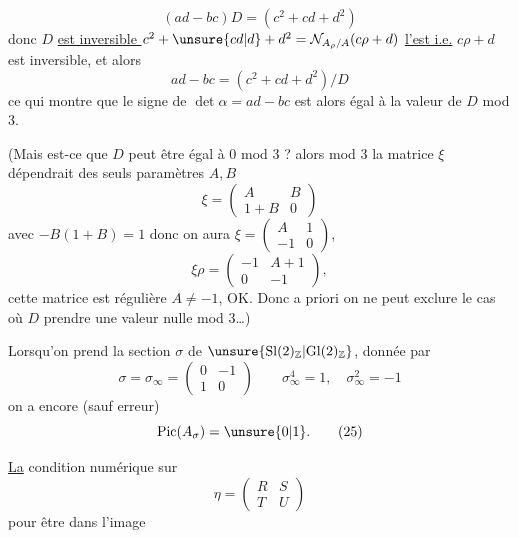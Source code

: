 
\[
(ad-bc)D=(c^2+cd+d^2) \tag{23}
\]
donc $D$ \uline{est inversible } $c^2+\unsure{cd|d}+d^2=\mathcal{N}_{A_\rho/A}(c\rho+d)$ \uline{l'est i.e.}  $c\rho+d$ est inversible, et alors
\[
ad-bc=(c^2+cd+d^2)/D
\]
ce qui montre que le signe de $\det\alpha=ad-bc$ est alors égal à la valeur de $D$ mod $3$.

(Mais est-ce que $D$ peut être égal à $0$ mod $3$ ? alors mod $3$ la matrice $\xi$  dépendrait des seuls paramètres $A,B$
\[
\xi=\begin{pmatrix}A&B\\1+B&0\end{pmatrix}
\]
avec $-B(1+B)=1$   
donc on aura $\xi=\begin{pmatrix}A&1\\-1&0\end{pmatrix}$, 
\[
\xi\rho=\begin{pmatrix}-1&A+1\\0&-1\end{pmatrix},
\]
cette matrice est régulière  $A\ne-1$, OK.\unsure{)|\}} Donc a priori on ne peut exclure le cas où $D$  prendre une valeur nulle mod $3$\ldots)

Lorsqu'on prend la section $\sigma$ de $\unsure{\mathrm{Sl}(2)_{\mathbb{Z}}|\mathrm{Gl}(2)_{\mathbb{Z}}}$, donnée par
\[
\sigma=\sigma_\infty=\begin{pmatrix}0&-1\\1&0\end{pmatrix}
\qquad \sigma_\infty^4=1,\quad \sigma_\infty^2=-1 \tag{24}
\]
on a encore (sauf erreur)
\[
\mathrm{Pic}(A_\sigma)=\unsure{0|1}. \tag{25}
\]

\uline{La} condition numérique sur
\[
\eta=\begin{pmatrix}R&S\\T&U\end{pmatrix} \tag{26}
\]
pour  être  dans l'image


